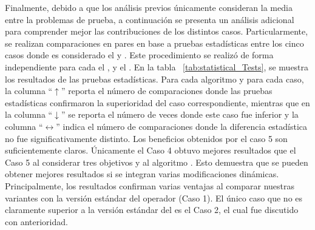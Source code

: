 Finalmente, debido a que los análisis previos únicamente consideran la media entre la problemas de prueba, a continuación se presenta un análisis adicional para comprender mejor las contribuciones de los distintos casos.
%
Particularmente, se realizan comparaciones en pares en base a pruebas estadísticas entre los cinco casos donde es considerado el \SBX{} y \DSBX{}.
%
Este procedimiento se realizó de forma independiente para cada el \NSGAII{}, \MOEAD{} y el \SMSEMOA{}.
%
En la tabla ~\ref{tab:statistical_Tests}, se muestra los resultados de las pruebas estadísticas.
%
Para cada algoritmo y para cada caso, la columna ``$\uparrow$'' reporta el número de comparaciones donde las pruebas estadísticas confirmaron la superioridad del caso correspondiente, mientras que en la columna ``$\downarrow$'' se reporta el número de veces donde este caso fue inferior y la columna ``$\longleftrightarrow$'' indica el número de comparaciones donde la diferencia estadística no fue significativamente distinto.
Los beneficios obtenidos por el caso 5 son suficientemente claros.
%
Únicamente el Caso 4 obtuvo mejores resultados que el Caso 5 al considerar tres objetivos y al algoritmo \NSGAII{}.
%
Esto demuestra que se pueden obtener mejores resultados si se integran varias modificaciones dinámicas.
%
Principalmente, los resultados confirman varias ventajas al comparar nuestras variantes con la versión estándar del operador \SBX{} (Caso 1).
%
El único caso que no es claramente superior a la versión estándar del \SBX{} es el Caso 2, el cual fue discutido con anterioridad.
%
